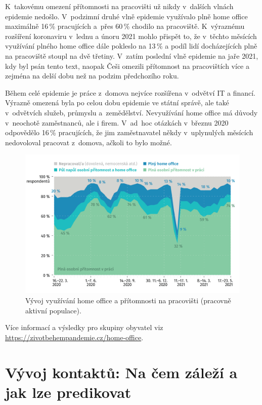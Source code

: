 K takovému omezení přítomnosti na pracovišti už nikdy v dalších vlnách epidemie nedošlo. V~podzimní druhé vlně epidemie využívalo plně home office maximálně 16\,\% pracujících a přes 60\,\% chodilo na pracoviště. K~výraznému rozšíření koronaviru v lednu a únoru 2021 mohlo přispět to, že v těchto měsících využívání plného home office dále pokleslo na 13\,\% a podíl lidí docházejících plně na pracoviště stoupl na dvě třetiny. V zatím poslední vlně epidemie na jaře 2021, kdy byl psán tento text, naopak Češi omezili přítomnost na pracovištích více a zejména na delší dobu než na podzim předchozího roku.

Během celé epidemie je práce z domova nejvíce rozšířena v odvětví IT a financí. Výrazně omezená byla po celou dobu epidemie ve státní správě, ale také v odvětvích služeb, průmyslu a zemědělství. Nevyužívání home office má důvody v neochotě zaměstnanců, ale i firem. V ad hoc otázkách v březnu 2020 odpovědělo 16\,\% pracujících, že jim zaměstnavatel někdy v uplynulých měsících nedovoloval pracovat z domova, ačkoli to bylo možné.

\begin{figure}[ht]
    \centering
    \includegraphics[width=\textwidth]{./pic/zbp-graf4.png}
    \caption{Vývoj využívání home office a přítomnosti na pracovišti (pracovně aktivní populace).}
    \label{fig:zbp4}
\end{figure}

Více informací a výsledky pro skupiny obyvatel viz \url{https://zivotbehempandemie.cz/home-office}.

\section*{Vývoj kontaktů: Na čem záleží a jak lze predikovat}

